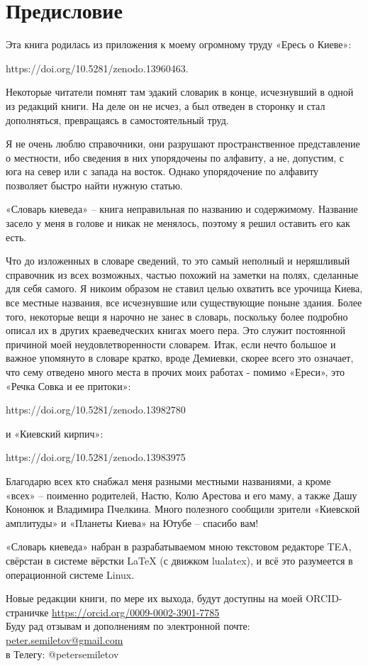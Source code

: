 \chapter*{Предисловие}

Эта книга родилась из приложения к моему огромному труду «Ересь о Киеве»:

https://doi.org/10.5281/zenodo.13960463.

Некоторые читатели помнят там эдакий словарик в конце, исчезнувший в одной из редакций книги. На деле он не исчез, а был отведен в сторонку и стал дополняться, превращаясь в самостоятельный труд.

Я не очень люблю справочники, они разрушают пространственное представление о местности, ибо сведения в них упорядочены по алфавиту, а не, допустим, с юга на север или с запада на восток. Однако упорядочение по алфавиту позволяет быстро найти нужную статью.

«Словарь киеведа» – книга неправильная по названию и содержимому. Название засело у меня в голове и никак не менялось, поэтому я решил оставить его как есть. 

Что до изложенных в словаре сведений, то это самый неполный и неряшливый справочник из всех возможных, частью похожий на заметки на полях, сделанные для себя самого. Я никоим образом не ставил целью охватить все урочища Киева, все местные названия, все исчезнувшие или существующие поныне здания. Более того, некоторые вещи я нарочно не занес в словарь, поскольку более подробно описал их в других краеведческих книгах моего пера. Это служит постоянной причиной моей неудовлетворенности словарем. Итак, если нечто большое и важное упомянуто в словаре кратко, вроде Демиевки, скорее всего это означает, что сему отведено много места в прочих моих работах - помимо «Ереси», это 
«Речка Совка и ее притоки»:

https://doi.org/10.5281/zenodo.13982780

и «Киевский кирпич»:

https://doi.org/10.5281/zenodo.13983975

Благодарю всех кто снабжал меня разными местными названиями, а кроме «всех» – поименно родителей, Настю, Колю Арестова и его маму, а также Дашу Кононюк и Владимира Пчелкина. Много полезного сообщили зрители «Киевской амплитуды» и «Планеты Киева» на Ютубе – спасибо вам!

«Словарь киеведа» набран в разрабатываемом мною текстовом редакторе TEA, свёрстан в системе вёрстки LaTeX (с движком lualatex), и всё это разумеется в операционной системе Linux.

Новые редакции книги, по мере их выхода, будут доступны на моей ORCID-страничке \href{https://orcid.org/0009-0002-3901-7785}{https://orcid.org/0009-0002-3901-7785}\\

Буду рад отзывам и дополнениям по электронной почте: \href{mailto:peter.semiletov@gmail.com}{peter.semiletov@gmail.com}\\
в Телегу: @petersemiletov
